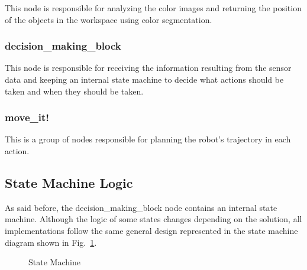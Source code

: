 This node is responsible for analyzing the color images and returning the position of the objects in the workspace using color segmentation.

\subsubsection{decision\_making\_block}

This node is responsible for receiving the information resulting from the sensor data and keeping an internal state machine to decide what actions should be taken and when they should be taken.

\subsubsection{move\_it!}

This is a group of nodes responsible for planning the robot's trajectory in each action.

\subsection{State Machine Logic}

As said before, the decision\_making\_block node contains an internal state machine. Although the logic of some states changes depending on the solution, all implementations follow the same general design represented in the state machine diagram shown in Fig.~\ref{fig:state_machine}.

\begin{figure}[H]%
    \centering
    
    \caption{State Machine}
    \label{fig:state_machine}
\end{figure}

